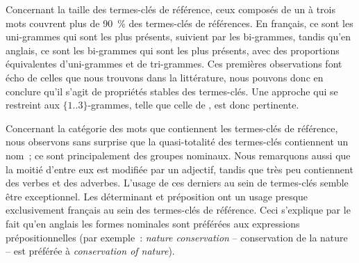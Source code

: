       Concernant la taille des termes-clés de référence, ceux composés de un à
      trois mots couvrent plus de 90~\% des termes-clés de références. En
      français, ce sont les uni-grammes qui sont les plus présents, suivient par
      les bi-grammes, tandis qu'en anglais, ce sont les bi-grammes qui sont les
      plus présents, avec des proportions équivalentes d'uni-grammes et de
      tri-grammes. Ces premières observations font écho de celles que nous
      trouvons dans la littérature, nous pouvons donc en conclure qu'il s'agit
      de propriétés stables des termes-clés. Une approche qui se restreint aux
      $\{1..3\}$-grammes, telle que celle de , est donc
      pertinente.

      Concernant la catégorie des mots que contiennent les termes-clés de
      référence, nous observons sans surprise que la quasi-totalité des
      termes-clés contiennent un nom~; ce sont principalement des groupes
      nominaux. Nous remarquons aussi que la moitié d'entre eux est modifiée par
      un adjectif, tandis que très peu contiennent des verbes et des adverbes.
      L'usage de ces derniers au sein de termes-clés semble être exceptionnel.
      Les déterminant et préposition ont un usage presque exclusivement français
      au sein des termes-clés de référence. Ceci s'explique par le fait qu'en
      anglais les formes nominales sont préférées aux expressions
      prépositionnelles (par exemple~: \textit{\og{}nature conservation\fg{}} --
      \og{}conservation de la nature\fg{} -- est préférée à
      \textit{\og{}conservation of nature\fg{}}).

